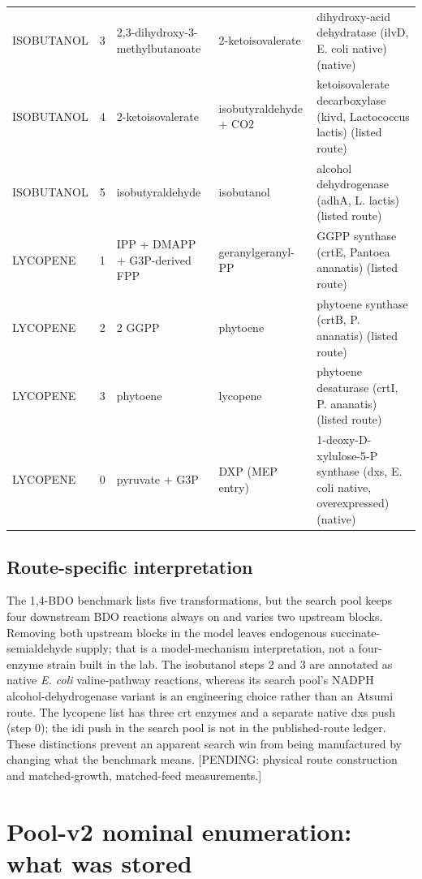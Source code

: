 \begin{table}[!htbp]
\begin{tabular}{p{1.4cm}rp{2.5cm}p{2.5cm}p{3.4cm}}
ISOBUTANOL & 3 & 2,3-dihydroxy-3-methylbutanoate & 2-ketoisovalerate & dihydroxy-acid dehydratase (ilvD, E. coli native) (native) \\
ISOBUTANOL & 4 & 2-ketoisovalerate & isobutyraldehyde + CO2 & ketoisovalerate decarboxylase (kivd, Lactococcus lactis) (listed route) \\
ISOBUTANOL & 5 & isobutyraldehyde & isobutanol & alcohol dehydrogenase (adhA, L. lactis) (listed route) \\
LYCOPENE & 1 & IPP + DMAPP + G3P-derived FPP & geranylgeranyl-PP & GGPP synthase (crtE, Pantoea ananatis) (listed route) \\
LYCOPENE & 2 & 2 GGPP & phytoene & phytoene synthase (crtB, P. ananatis) (listed route) \\
LYCOPENE & 3 & phytoene & lycopene & phytoene desaturase (crtI, P. ananatis) (listed route) \\
LYCOPENE & 0 & pyruvate + G3P & DXP (MEP entry) & 1-deoxy-D-xylulose-5-P synthase (dxs, E. coli native, overexpressed) (native) \\
\hline\end{tabular}\end{table}
\subsection{Route-specific interpretation}
The 1,4-BDO benchmark lists five transformations, but the search pool keeps four downstream BDO reactions always on and varies two upstream blocks. Removing both upstream blocks in the model leaves endogenous succinate-semialdehyde supply; that is a model-mechanism interpretation, not a four-enzyme strain built in the lab. The isobutanol steps 2 and 3 are annotated as native \emph{E. coli} valine-pathway reactions, whereas its search pool's NADPH alcohol-dehydrogenase variant is an engineering choice rather than an Atsumi route. The lycopene list has three crt enzymes and a separate native dxs push (step 0); the idi push in the search pool is not in the published-route ledger. These distinctions prevent an apparent search win from being manufactured by changing what the benchmark means. [PENDING: physical route construction and matched-growth, matched-feed measurements.]

\section{Pool-v2 nominal enumeration: what was stored}
